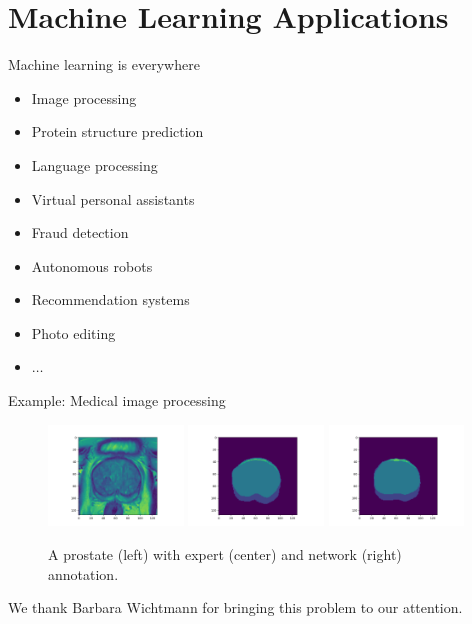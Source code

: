 \documentclass{beamer}
\begin{document}
    \section{Machine Learning Applications}
    \begin{frame}{Machine learning is everywhere}
        \begin{itemize}
          \item Image processing
          \item Protein structure prediction
          \item Language processing
          \item Virtual personal assistants
          \item Fraud detection
          \item Autonomous robots
          \item Recommendation systems
          \item Photo editing
          \item $\dots$
        \end{itemize}
    \end{frame}
  
    \begin{frame}{Example: Medical image processing \cite{esann2024wolter}}
      \begin{figure}
        \includegraphics[width=0.32\textwidth]{./figures/prostatext2.png}
        \includegraphics[width=0.32\textwidth]{./figures/prostatext2_true.png}
        \includegraphics[width=0.32\textwidth]{./figures/prostatext2_net.png}
      \caption{A prostate (left) with expert (center) and network (right) annotation.}
      \end{figure}

      We thank Barbara Wichtmann for bringing this problem to our attention.
    \end{frame}
\end{document}
